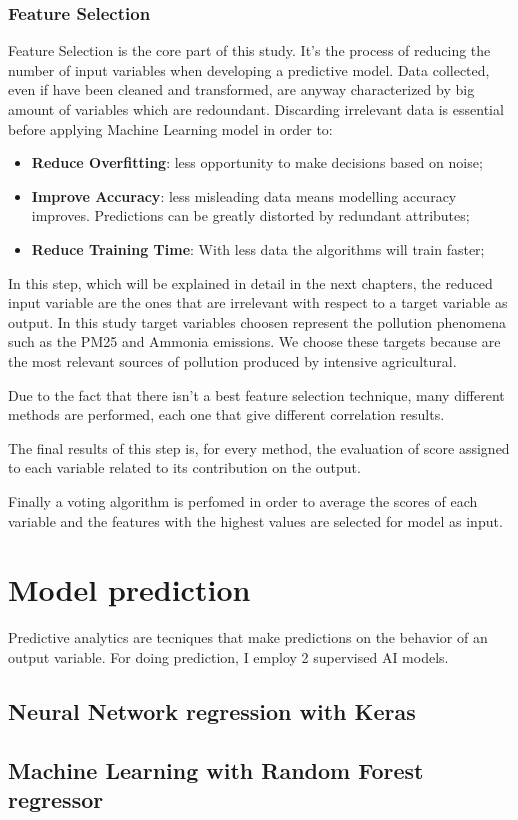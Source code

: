 \subsubsection{Feature Selection}
Feature Selection is the core part of this study. It's the process of reducing the number of input variables when developing a predictive model. 
Data collected, even if have been cleaned and transformed, are anyway characterized by big amount of variables which are redoundant.
Discarding irrelevant data is essential before applying Machine Learning model in order to:
\begin{itemize}
\item \textbf{Reduce Overfitting}: less opportunity to make decisions based on noise;
\item \textbf{Improve Accuracy}: less misleading data means modelling accuracy improves. Predictions can be greatly distorted by redundant attributes;
\item \textbf{Reduce Training Time}: With less data the algorithms will train faster;
\end{itemize}
In this step, which will be explained in detail in the next chapters, the reduced input variable are the ones that are irrelevant with respect to a target variable as output. \newline
In this study target variables choosen represent the pollution phenomena such as the PM25 and Ammonia emissions. We choose these targets because are the most relevant sources of pollution produced by intensive agricultural.\par
Due to the fact that there isn’t a best feature selection technique, many different methods are performed, each one that give different correlation results.\par
The final results of this step is, for every method, the evaluation of score assigned to each variable related to its contribution on the output.\par
Finally a voting algorithm is perfomed in order to average the scores of each variable and the features with the highest values are selected for model as input.
\section{Model prediction}
Predictive analytics are tecniques that make predictions on the behavior of an output variable. 
For doing prediction, I employ 2 supervised AI models.\newline
\subsection{Neural Network regression with Keras}
\subsection{Machine Learning with Random Forest regressor}